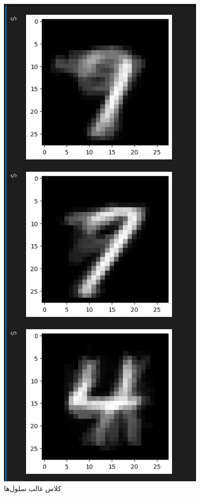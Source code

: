 \documentclass{article}
\begin{document}
\begin{figure}[!h]
    \centering\includegraphics[scale=.65]{./p6-2}
    \caption{کلاس غالب سلول‌ها}\label{fig.62}
\end{figure}
\end{document}
